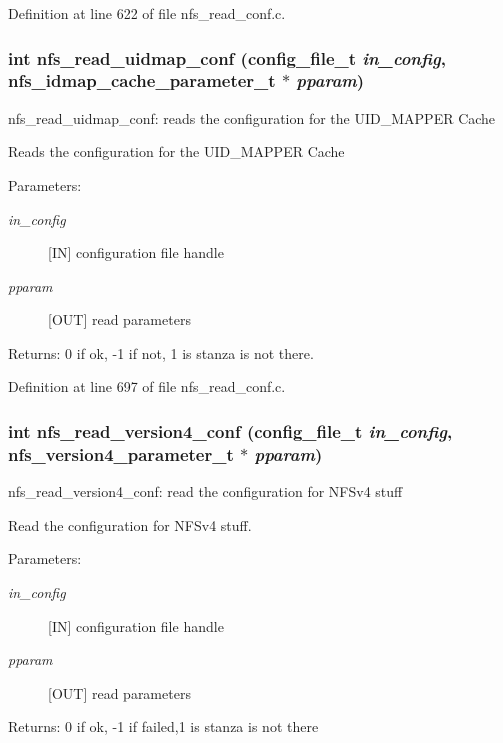 Definition at line 622 of file nfs\_\-read\_\-conf.c.
\subsubsection{\setlength{\rightskip}{0pt plus 5cm}int nfs\_\-read\_\-uidmap\_\-conf (config\_\-file\_\-t {\em in\_\-config}, nfs\_\-idmap\_\-cache\_\-parameter\_\-t $\ast$ {\em pparam})}\label{nfs__read__conf_8c_a6}


nfs\_\-read\_\-uidmap\_\-conf: reads the configuration for the UID\_\-MAPPER Cache

Reads the configuration for the UID\_\-MAPPER Cache

\begin{Desc}
\item[Parameters:]
\begin{description}
\item[{\em in\_\-config}][IN] configuration file handle \item[{\em pparam}][OUT] read parameters\end{description}
\end{Desc}
\begin{Desc}
\item[Returns:]0 if ok, -1 if not, 1 is stanza is not there. \end{Desc}


Definition at line 697 of file nfs\_\-read\_\-conf.c.
\subsubsection{\setlength{\rightskip}{0pt plus 5cm}int nfs\_\-read\_\-version4\_\-conf (config\_\-file\_\-t {\em in\_\-config}, nfs\_\-version4\_\-parameter\_\-t $\ast$ {\em pparam})}\label{nfs__read__conf_8c_a9}


nfs\_\-read\_\-version4\_\-conf: read the configuration for NFSv4 stuff

Read the configuration for NFSv4 stuff.

\begin{Desc}
\item[Parameters:]
\begin{description}
\item[{\em in\_\-config}][IN] configuration file handle \item[{\em pparam}][OUT] read parameters\end{description}
\end{Desc}
\begin{Desc}
\item[Returns:]0 if ok, -1 if failed,1 is stanza is not there \end{Desc}


